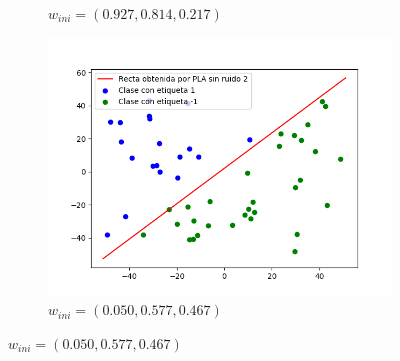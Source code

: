 \documentclass[12pt,a4paper]{article}
\begin{document}
\begin{figure}[H]
\begin{subfigure}{0.33\textwidth}
		\caption{$w_{ini} = (0.927,0.814,0.217)$}
	\end{subfigure}
	\begin{subfigure}{0.33\textwidth}
		\includegraphics[scale=0.37]{./Imagenes/ej2-4.png}
		\caption{$w_{ini} = (0.050,0.577,0.467)$}
	\end{subfigure}
\end{figure}
\end{document}
